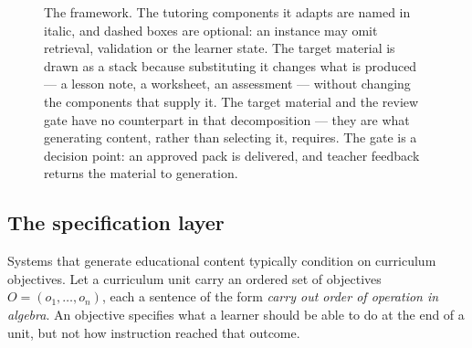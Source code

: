 \documentclass{article}
\begin{document}
\begin{figure}[!tb]
{}
\caption{The framework. The tutoring components it adapts are named in italic, and dashed
boxes are optional: an instance may omit retrieval, validation or the learner state. The target
material is drawn as a stack because substituting it changes what is produced --- a lesson
note, a worksheet, an assessment --- without changing the components that supply it. The target
material and the review gate have no counterpart in that decomposition --- they are what
generating content, rather than selecting it, requires. The gate is a decision point: an
approved pack is delivered, and teacher feedback returns the material to generation.}
\label{fig:framework}
\end{figure}

\subsection{The specification layer}
\label{sec:plan}

Systems that generate educational content typically condition on curriculum objectives. Let a
curriculum unit carry an ordered set of objectives $O=(o_1,\dots,o_n)$, each a sentence of the
form \emph{carry out order of operation in algebra}. An objective specifies what a learner
should be able to do at the end of a unit, but not how instruction reached that outcome.
\end{document}
